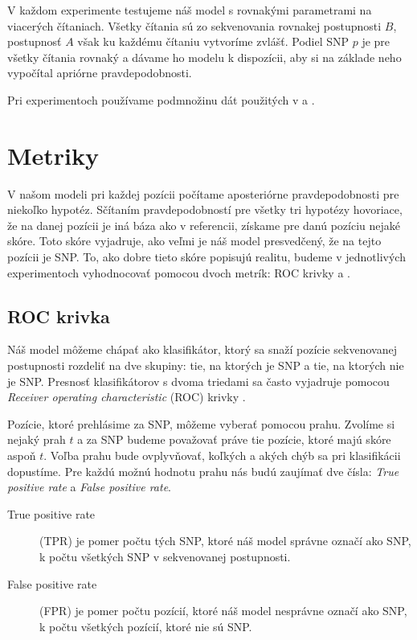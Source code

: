 V každom experimente testujeme náš model s rovnakými parametrami na viacerých čítaniach. Všetky čítania
sú zo sekvenovania rovnakej postupnosti $B$, postupnosť $A$ však ku každému čítaniu vytvoríme zvlášť.
Podiel SNP $p$ je pre všetky čítania rovnaký a dávame ho modelu k dispozícii, aby si na základe
neho vypočítal apriórne pravdepodobnosti.

Pri experimentoch používame podmnožinu dát použitých v \cite{BasecallerComparison} a .

\section{Metriky}

V našom modeli pri každej pozícii počítame aposteriórne pravdepodobnosti pre niekoľko hypotéz. Sčítaním
pravdepodobností pre všetky tri hypotézy hovoriace, že na danej pozícii je iná báza ako v referencii,
získame pre danú pozíciu nejaké skóre. Toto skóre vyjadruje, ako veľmi je náš model presvedčený, že na tejto pozícii je SNP. To, ako dobre tieto skóre popisujú realitu, budeme v jednotlivých experimentoch vyhodnocovať pomocou dvoch metrík: ROC krivky a \todo{}.

\subsection{ROC krivka}

Náš model môžeme chápať ako klasifikátor, ktorý sa snaží pozície sekvenovanej postupnosti rozdeliť
na dve skupiny: tie, na ktorých je SNP a tie, na ktorých nie je SNP.
Presnosť klasifikátorov s dvoma triedami sa často vyjadruje pomocou \emph{Receiver operating characteristic} (ROC) krivky .

Pozície, ktoré prehlásime za SNP, môžeme vyberať pomocou prahu. Zvolíme si nejaký prah $t$ a za
SNP budeme považovať práve tie pozície, ktoré majú skóre aspoň $t$. Voľba prahu bude ovplyvňovať,
koľkých a akých chýb sa pri klasifikácii dopustíme.
Pre každú možnú hodnotu prahu nás budú zaujímať dve čísla: \emph{True positive rate} a \emph{False positive rate}. 

\begin{definicia} 
\leavevmode
\begin{description}
\item[True positive rate] (TPR) je pomer počtu tých SNP, ktoré náš model správne označí ako SNP, k počtu všetkých SNP v sekvenovanej postupnosti.
\item[False positive rate] (FPR) je pomer počtu
pozícií, ktoré náš model nesprávne označí ako SNP, k počtu všetkých pozícií, ktoré nie sú SNP.
\end{description}
\end{definicia}

